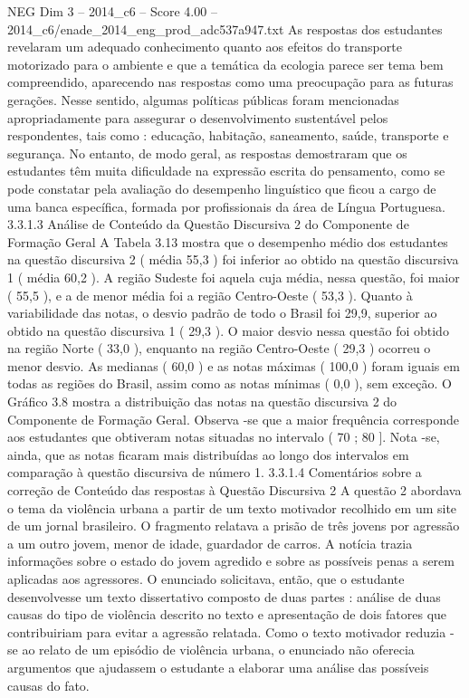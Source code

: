 \begin{textsample}{NEG Dim 3 – 2014\_c6 – Score 4.00 – 2014\_c6/enade\_2014\_eng\_prod\_adc537a947.txt}
As respostas dos estudantes revelaram um adequado conhecimento quanto aos efeitos do transporte motorizado para o ambiente e que a temática da ecologia parece ser tema bem compreendido, aparecendo nas respostas como uma preocupação para as futuras gerações.
Nesse sentido, algumas políticas públicas foram mencionadas apropriadamente para assegurar o desenvolvimento sustentável pelos respondentes, tais como : educação, habitação, saneamento, saúde, transporte e segurança.
No entanto, de modo geral, as respostas demostraram que os estudantes têm muita dificuldade na expressão escrita do pensamento, como se pode constatar pela avaliação do desempenho linguístico que ficou a cargo de uma banca específica, formada por profissionais da área de Língua Portuguesa. 3.3.1.3 Análise de Conteúdo da Questão Discursiva 2 do Componente de Formação Geral A Tabela 3.13 mostra que o desempenho médio dos estudantes na questão discursiva 2 ( média 55,3 ) foi inferior ao obtido na questão discursiva 1 ( média 60,2 ).
A região Sudeste foi aquela cuja média, nessa questão, foi maior ( 55,5 ), e a de menor média foi a região Centro-Oeste ( 53,3 ).
Quanto à variabilidade das notas, o desvio padrão de todo o Brasil foi 29,9, superior ao obtido na questão discursiva 1 ( 29,3 ).
O maior desvio nessa questão foi obtido na região Norte ( 33,0 ), enquanto na região Centro-Oeste ( 29,3 ) ocorreu o menor desvio.
As medianas ( 60,0 ) e as notas máximas ( 100,0 ) foram iguais em todas as regiões do Brasil, assim como as notas mínimas ( 0,0 ), sem exceção.
O Gráfico 3.8 mostra a distribuição das notas na questão discursiva 2 do Componente de Formação Geral.
Observa -se que a maior frequência corresponde aos estudantes que obtiveram notas situadas no intervalo ( 70 ; 80 ].
Nota -se, ainda, que as notas ficaram mais distribuídas ao longo dos intervalos em comparação à questão discursiva de número 1. 3.3.1.4 Comentários sobre a correção de Conteúdo das respostas à Questão Discursiva 2 A questão 2 abordava o tema da violência urbana a partir de um texto motivador recolhido em um site de um jornal brasileiro.
O fragmento relatava a prisão de três jovens por agressão a um outro jovem, menor de idade, guardador de carros.
A notícia trazia informações sobre o estado do jovem agredido e sobre as possíveis penas a serem aplicadas aos agressores.
O enunciado solicitava, então, que o estudante desenvolvesse um texto dissertativo composto de duas partes : análise de duas causas do tipo de violência descrito no texto e apresentação de dois fatores que contribuiriam para evitar a agressão relatada.
Como o texto motivador reduzia -se ao relato de um episódio de violência urbana, o enunciado não oferecia argumentos que ajudassem o estudante a elaborar uma análise das possíveis causas do fato.

\end{textsample}
